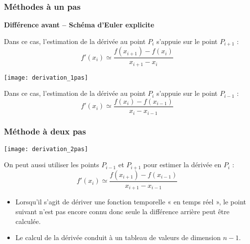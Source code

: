 %

\subsubsection{Méthodes à un pas}


\begin{resultat}
\textbf{Différence avant -- Schéma d'Euler explicite}

Dans ce cas, l'estimation de la dérivée au point $P_i$ s'appuie sur le point $P_{i+1}$ :
$$
f'(x_i)\simeq\dfrac{f(x_{i+1})-f(x_i)}{x_{i+1}-x_i}
$$
\end{resultat}


\begin{marginfigure}
\texttt{[image: derivation\_1pas]}
\end{marginfigure}

\begin{resultat}

Dans ce cas, l'estimation de la dérivée au point $P_i$ s'appuie sur le point $P_{i-1}$ :
$$
f'(x_i)\simeq\dfrac{f(x_{i})-f(x_{i-1})}{x_{i}-x_{i-1}}
$$
\end{resultat}


\subsubsection{Méthode à deux pas}

\begin{marginfigure}
\texttt{[image: derivation\_2pas]}
\end{marginfigure}

\begin{resultat}
On peut aussi utiliser les points $P_{i-1}$ et $P_{i+1}$ pour estimer la dérivée en $P_i$ :
$$
f'(x_i)\simeq\dfrac{f(x_{i+1})-f(x_{i-1})}{x_{i+1}-x_{i-1}}
$$
\end{resultat}

\begin{remarques}
\begin{itemize}
\item Lorsqu'il s'agit de dériver une fonction temporelle « en temps réel », le point suivant n’est pas encore connu donc seule la différence arrière peut être calculée.
\item Le calcul de la dérivée conduit à un tableau de valeurs de dimension $n-1$.
\end{itemize}
\end{remarques}



